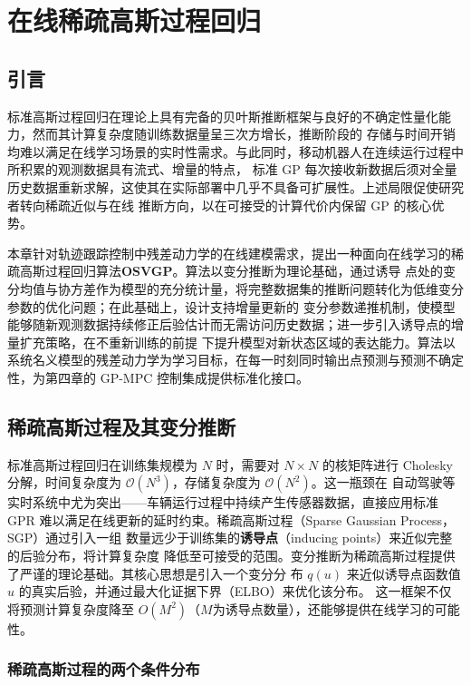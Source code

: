 \chapter{在线稀疏高斯过程回归}

\section{引言}

标准高斯过程回归在理论上具有完备的贝叶斯推断框架与良好的不确定性量化能力，然而其计算复杂度随训练数据量呈三次方增长，推断阶段的
存储与时间开销均难以满足在线学习场景的实时性需求。与此同时，移动机器人在连续运行过程中所积累的观测数据具有流式、增量的特点，
标准 GP 每次接收新数据后须对全量历史数据重新求解，这使其在实际部署中几乎不具备可扩展性。上述局限促使研究者转向稀疏近似与在线
推断方向，以在可接受的计算代价内保留 GP 的核心优势。

本章针对轨迹跟踪控制中残差动力学的在线建模需求，提出一种面向在线学习的稀疏高斯过程回归算法\textbf{OSVGP}。算法以变分推断为理论基础，通过诱导
点处的变分均值与协方差作为模型的充分统计量，将完整数据集的推断问题转化为低维变分参数的优化问题；在此基础上，设计支持增量更新的
变分参数递推机制，使模型能够随新观测数据持续修正后验估计而无需访问历史数据；进一步引入诱导点的增量扩充策略，在不重新训练的前提
下提升模型对新状态区域的表达能力。算法以系统名义模型的残差动力学为学习目标，在每一时刻同时输出点预测与预测不确定性，为第四章的
 GP-MPC 控制集成提供标准化接口。

\section{稀疏高斯过程及其变分推断}

标准高斯过程回归在训练集规模为 $N$ 时，需要对 $N \times N$ 的核矩阵进行 Cholesky
分解，时间复杂度为 $\mathcal{O}(N^3)$，存储复杂度为 $\mathcal{O}(N^2)$。这一瓶颈在
自动驾驶等实时系统中尤为突出——车辆运行过程中持续产生传感器数据，直接应用标准 GPR
难以满足在线更新的延时约束。稀疏高斯过程（Sparse Gaussian Process，SGP）通过引入一组
数量远少于训练集的\textbf{诱导点}（inducing points）来近似完整的后验分布，将计算复杂度
降低至可接受的范围。变分推断为稀疏高斯过程提供了严谨的理论基础。其核心思想是引入一个变分分
布 $q(u)$ 来近似诱导点函数值 $u$ 的真实后验，并通过最大化证据下界（ELBO）来优化该分布。
这一框架不仅将预测计算复杂度降至 $O(M^2)$（$M$为诱导点数量），还能够提供在线学习的可能性。

\subsection{稀疏高斯过程的两个条件分布}

